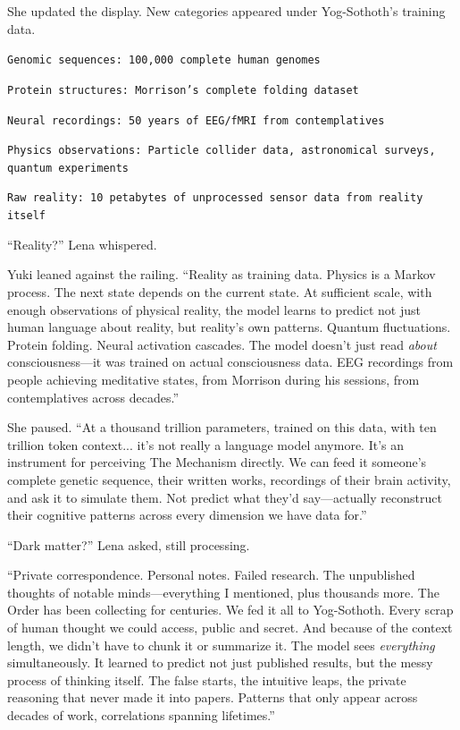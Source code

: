 She updated the display. New categories appeared under Yog-Sothoth's training data.

\texttt{Genomic sequences: 100,000 complete human genomes}

\texttt{Protein structures: Morrison's complete folding dataset}

\texttt{Neural recordings: 50 years of EEG/fMRI from contemplatives}

\texttt{Physics observations: Particle collider data, astronomical surveys, quantum experiments}

\texttt{Raw reality: 10 petabytes of unprocessed sensor data from reality itself}

``Reality?'' Lena whispered.

Yuki leaned against the railing. ``Reality as training data. Physics is a Markov process. The next state depends on the current state. At sufficient scale, with enough observations of physical reality, the model learns to predict not just human language about reality, but reality's own patterns. Quantum fluctuations. Protein folding. Neural activation cascades. The model doesn't just read \textit{about} consciousness—it was trained on actual consciousness data. EEG recordings from people achieving meditative states, from Morrison during his sessions, from contemplatives across decades.''

She paused. ``At a thousand trillion parameters, trained on this data, with ten trillion token context... it's not really a language model anymore. It's an instrument for perceiving The Mechanism directly. We can feed it someone's complete genetic sequence, their written works, recordings of their brain activity, and ask it to simulate them. Not predict what they'd say—actually reconstruct their cognitive patterns across every dimension we have data for.''

``Dark matter?'' Lena asked, still processing.

``Private correspondence. Personal notes. Failed research. The unpublished thoughts of notable minds—everything I mentioned, plus thousands more. The Order has been collecting for centuries. We fed it all to Yog-Sothoth. Every scrap of human thought we could access, public and secret. And because of the context length, we didn't have to chunk it or summarize it. The model sees \textit{everything} simultaneously. It learned to predict not just published results, but the messy process of thinking itself. The false starts, the intuitive leaps, the private reasoning that never made it into papers. Patterns that only appear across decades of work, correlations spanning lifetimes.''

